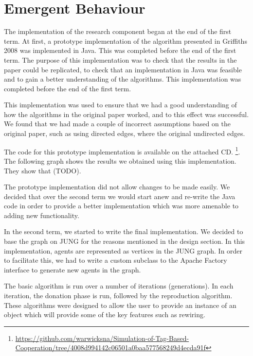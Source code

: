 \section{Emergent Behaviour}

The implementation of the research component began at the end of the first term. At first, a prototype implementation of the algorithm presented in Griffiths 2008 was implemented in Java. This was completed before the end of the first term. The purpose of this implementation was to check that the results in the paper could be replicated, to check that an implementation in Java was feasible and to gain a better understanding of the algorithms. This implementation was completed before the end of the first term.

This implementation was used to ensure that we had a good understanding of how the algorithms in the original paper worked, and to this effect was successful. We found that we had made a couple of incorrect assumptions based on the original paper, such as using directed edges, where the original undirected edges. 

The code for this prototype implementation is available on the attached CD. \footnote{\url{https://github.com/warwicksna/Simulation-of-Tag-Based-Cooperation/tree/4008d994142c06501a0baa577568249d4ecda91f}}. The following graph shows the results we obtained using this implementation. They show that (TODO).

The prototype implementation did not allow changes to be made easily. We decided that over the second term we would start anew and re-write the Java code in order to provide a better implementation which was more amenable to adding new functionality.

In the second term, we started to write the final implementation. We decided to base the graph on JUNG for the reasons mentioned in the design section. In this implementation, agents are represented as vertices in the JUNG graph. In order to facilitate this, we had to write a custom subclass to the Apache Factory interface to generate new agents in the graph.

The basic algorithm is run over a number of iterations (generations). In each iteration, the donation phase is run, followed by the reproduction algorithm. These algorithms were designed to allow the user to provide an instance of an object which will provide some of the key features such as rewiring.

